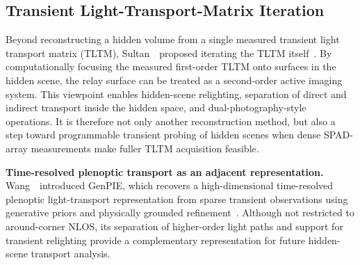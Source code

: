 \subsection{Transient Light-Transport-Matrix Iteration}
Beyond reconstructing a hidden volume from a single measured transient light transport matrix (TLTM), Sultan~\etal~proposed iterating the TLTM itself~\cite{sultanIteratingTLTM2026}. By computationally focusing the measured first-order TLTM onto surfaces in the hidden scene, the relay surface can be treated as a second-order active imaging system. This viewpoint enables hidden-scene relighting, separation of direct and indirect transport inside the hidden space, and dual-photography-style operations. It is therefore not only another reconstruction method, but also a step toward programmable transient probing of hidden scenes when dense SPAD-array measurements make fuller TLTM acquisition feasible.

\vspace{0.8mm}
\noindent \textbf{Time-resolved plenoptic transport as an adjacent representation.}
Wang~\etal~introduced GenPIE, which recovers a high-dimensional time-resolved plenoptic light-transport representation from sparse transient observations using generative priors and physically grounded refinement~\cite{wangGenPIE2026}. Although not restricted to around-corner NLOS, its separation of higher-order light paths and support for transient relighting provide a complementary representation for future hidden-scene transport analysis.

